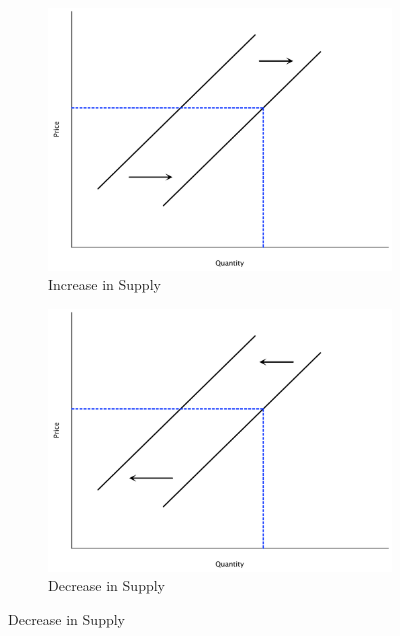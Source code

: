 \documentclass[11pt]{article}\usepackage[]{graphicx}\usepackage[]{color}
\theoremstyle{definition}
\begin{document}
	
	\begin{figure}[H]
		\centering
		\caption{Shifts in Supply}
		\begin{subfigure}{.5\textwidth}
			\includegraphics[scale=.3]{plot11.pdf}
			\caption{Increase in Supply}
		\end{subfigure}%
		\begin{subfigure}{.5\textwidth}
			\centering
			\includegraphics[scale=.3]{plot12.pdf}
			\caption{Decrease in Supply}
		\end{subfigure}
	\end{figure}
\end{document}

